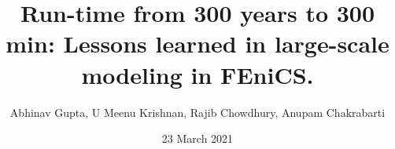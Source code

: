 \title[{\sc 300 Years to 300 min } \hspace{0.8cm} ]{{\sc Run-time from 300 years to 300 min: Lessons learned in large-scale modeling in FEniCS.}}
\author[FENICS 2021 --- {\sc March 23\superscript{rd}, 2021}]{{Abhinav Gupta}, U Meenu Krishnan, Rajib Chowdhury, Anupam Chakrabarti}
\date{23 March 2021}
